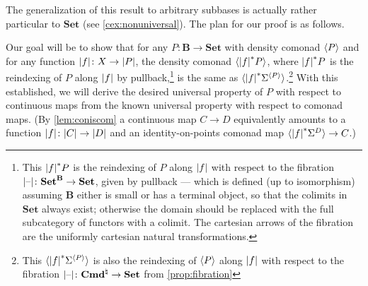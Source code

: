\documentclass[11pt, oneside, article]{memoir}
\theoremstyle{plain}
\theoremstyle{definition}
\theoremstyle{remark}
\DeclareMathOperator{\id}{id}
\DeclarePairedDelimiter{\gen}{\langle}{\rangle}
\DeclarePairedDelimiter{\abs}{\lvert}{\rvert}
\newcommand{\dash}{{\mathord{\text{--}}}}
\newcommand{\namedcat}[1]{\mathbf{#1}}
\newcommand{\cat}[1]{\mathbf{#1}}
\newcommand{\Set}{\namedcat{Set}}
\newcommand{\Con}{\namedcat{Cmd}^\natural}
\newcommand{\ConO}{\Con}
\newcommand{\ConOSet}{\ConO}
\newcommand{\pts}[1]{{\abs{#1}}}
\newcommand{\one}[1]{\pts{#1}}
\newcommand{\lift}[1]{\widecheck{#1}}
\newcommand{\extend}[1]{\widehat{#1}}
\newcommand{\nerve}[1]{(\dash)^{#1}}
\newcommand{\bsheaf}[1]{\nerve{\lift{#1}}}
\newcommand{\carr}{\Sigma}
\newcommand{\car}[1]{\carr^{#1}}
\newcommand{\carC}{\car{\cC}}
\newcommand{\carD}{\car{\cD}}
\newcommand{\carP}{\car{\cP}}
\newcommand{\ph}[1]{#1}
\newcommand{\fun}[2]{{#2}^{#1}}
\newcommand{\cmnd}[1]{{#1}}
\newcommand{\xX}{X}
\newcommand{\cC}{\cmnd{C}}
\newcommand{\cD}{\cmnd{D}}
\newcommand{\bB}{\cat{B}}
\newcommand{\pP}{\ph{P}}
\newcommand{\cP}{\gen{\pP}}
\newcommand{\lP}{\lift{\pP}}
\begin{document}


The generalization of this result to arbitrary subbases is actually
rather particular to $\Set$ (see \cref{cex:nonuniversal}). The plan
for our proof is as follows.

Our goal will be to show that for any $\pP \colon \bB \to \Set$ with
density comonad $\cP$ and for any function
$\one{f} \colon \xX \to \pts{\pP}$, the density comonad
$\gen{\one{f}^* \pP}$, where $\one{f}^* \pP$ is the reindexing of
$\pP$ along $\one{f}$ by pullback,\footnote{This $\one{f}^* \pP$ is
  the reindexing of $\pP$ along $\one{f}$ with respect to the
  fibration $\pts{\dash} \colon \fun{\bB}{\Set} \to \Set$, given by
  pullback --- which is defined (up to isomorphism) assuming $\bB$
  either is small or has a terminal object, so that the colimits in
  $\Set$ always exist; otherwise the domain should be replaced with
  the full subcategory of functors with a colimit. The cartesian
  arrows of the fibration are the uniformly cartesian natural
  transformations.} is the same as
$\gen{\one{f}^* \carP}$.\footnote{This $\gen{\one{f}^* \carP}$ is also
  the reindexing of $\cP$ along $\one{f}$ with respect to the
  fibration $\one{\dash} \colon \ConOSet \to \Set$ from
  \cref{prop:fibration}} With this established, we will derive the
desired universal property of $\pP$ with respect to continuous maps
from the known universal property with respect to comonad maps. (By
\cref{lem:coniscom} a continuous map $\cC \to \cD$ equivalently
amounts to a function $\one{f} \colon \pts{\cC} \to \pts{\cD}$ and an
identity-on-points comonad map $\gen{\one{f}^* \carD} \to \cC$.)
\end{document}
